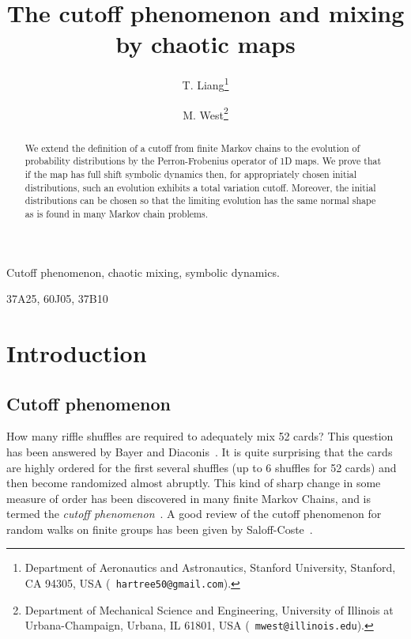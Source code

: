 \documentclass[final]{siamltex}
\title{The cutoff phenomenon and mixing by chaotic maps}
\author{T. Liang\thanks{Department of Aeronautics and Astronautics,
    Stanford University, Stanford, CA 94305, USA ({\tt
      hartree50@gmail.com}).}  \and M. West\thanks{Department of
    Mechanical Science and Engineering, University of Illinois at
    Urbana-Champaign, Urbana, IL 61801, USA ({\tt
      mwest@illinois.edu}).}}
\begin{document}
\maketitle
\begin{abstract}
  We extend the definition of a cutoff from finite Markov chains to
  the evolution of probability distributions by the Perron-Frobenius
  operator of 1D maps. We prove that if the map has full shift
  symbolic dynamics then, for appropriately chosen initial
  distributions, such an evolution exhibits a total variation
  cutoff. Moreover, the initial distributions can be chosen so that
  the limiting evolution has the same normal shape as is found in many
  Markov chain problems.
\end{abstract}


\begin{keywords} 
Cutoff phenomenon, chaotic mixing, symbolic dynamics.
\end{keywords}

\begin{AMS}
37A25, 60J05, 37B10
\end{AMS}


\pagestyle{myheadings}
\thispagestyle{plain}


\section{Introduction}
\label{sec:symdynintro}

\subsection{Cutoff phenomenon}
How many riffle shuffles are required to adequately mix 52 cards?
This question has been answered by Bayer and
Diaconis~\cite{Diaconis1992}. It is quite surprising that the cards
are highly ordered for the first several shuffles (up to 6 shuffles
for 52 cards) and then become randomized almost abruptly.  This kind
of sharp change in some measure of order has been discovered in many
finite Markov Chains, and is termed the \emph{cutoff
  phenomenon}~\cite{Diaconis1986}. A good review of the cutoff
phenomenon for random walks on finite groups has been given by
Saloff-Coste~\cite{LSaloff-Costt2004}.
\end{document}
